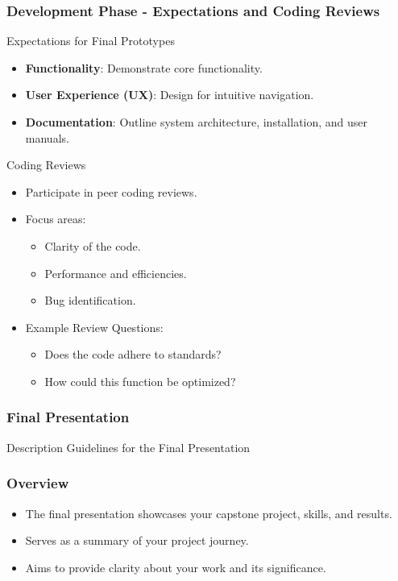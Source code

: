 \documentclass{beamer}
\begin{document}
\begin{frame}[fragile]
    \frametitle{Development Phase - Expectations and Coding Reviews}
    \begin{block}{Expectations for Final Prototypes}
        \begin{itemize}
            \item \textbf{Functionality}: Demonstrate core functionality.
            \item \textbf{User Experience (UX)}: Design for intuitive navigation.
            \item \textbf{Documentation}: Outline system architecture, installation, and user manuals.
        \end{itemize}
    \end{block}

    \begin{block}{Coding Reviews}
        \begin{itemize}
            \item Participate in peer coding reviews.
            \item Focus areas:
            \begin{itemize}
                \item Clarity of the code.
                \item Performance and efficiencies.
                \item Bug identification.
            \end{itemize}
            \item Example Review Questions:
            \begin{itemize}
                \item Does the code adhere to standards?
                \item How could this function be optimized?
            \end{itemize}
        \end{itemize}
    \end{block}
\end{frame}

\begin{frame}[fragile]
    \frametitle{Final Presentation}
    \begin{block}{Description}
        Guidelines for the Final Presentation
    \end{block}
\end{frame}

\begin{frame}[fragile]
    \frametitle{Overview}
    \begin{itemize}
        \item The final presentation showcases your capstone project, skills, and results.
        \item Serves as a summary of your project journey.
        \item Aims to provide clarity about your work and its significance.
    \end{itemize}
\end{frame}
\end{document}
